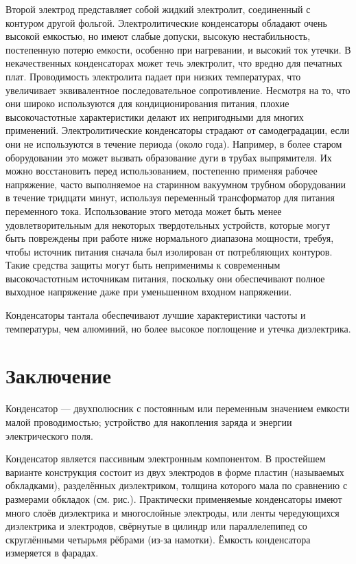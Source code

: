 Второй электрод представляет собой жидкий электролит, соединенный с контуром другой фольгой. Электролитические конденсаторы обладают очень высокой емкостью, но имеют слабые допуски, высокую нестабильность, постепенную потерю емкости, особенно при нагревании, и высокий ток утечки. В некачественных конденсаторах может течь электролит, что вредно для печатных плат. Проводимость электролита падает при низких температурах, что увеличивает эквивалентное последовательное сопротивление. Несмотря на то, что они широко используются для кондиционирования питания, плохие высокочастотные характеристики делают их непригодными для многих применений. Электролитические конденсаторы страдают от самодеградации, если они не используются в течение периода (около года). Например, в более старом оборудовании это может вызвать образование дуги в трубах выпрямителя. Их можно восстановить перед использованием, постепенно применяя рабочее напряжение, часто выполняемое на старинном вакуумном трубном оборудовании в течение тридцати минут, используя переменный трансформатор для питания переменного тока. Использование этого метода может быть менее удовлетворительным для некоторых твердотельных устройств, которые могут быть повреждены при работе ниже нормального диапазона мощности, требуя, чтобы источник питания сначала был изолирован от потребляющих контуров. Такие средства защиты могут быть неприменимы к современным высокочастотным источникам питания, поскольку они обеспечивают полное выходное напряжение даже при уменьшенном входном напряжении. 

Конденсаторы тантала обеспечивают лучшие характеристики частоты и температуры, чем алюминий, но более высокое поглощение и утечка диэлектрика. \cite{ERMUR}



\chapter{Заключение}

Конденсатор — двухполюсник с постоянным или переменным значением емкости малой проводимостью; устройство для накопления заряда и энергии электрического поля.

Конденсатор является пассивным электронным компонентом. В простейшем варианте конструкция состоит из двух электродов в форме пластин (называемых обкладками), разделённых диэлектриком, толщина которого мала по сравнению с размерами обкладок (см. рис.). Практически применяемые конденсаторы имеют много слоёв диэлектрика и многослойные электроды, или ленты чередующихся диэлектрика и электродов, свёрнутые в цилиндр или параллелепипед со скруглёнными четырьмя рёбрами (из-за намотки). Ёмкость конденсатора измеряется в фарадах.
